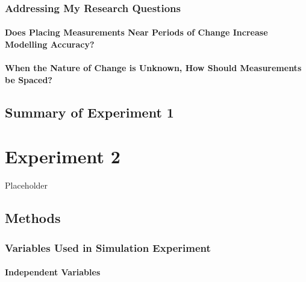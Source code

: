 \documentclass[
12pt, %
twoside,
english]{guelphthesis}
\begin{document}
\hypertarget{addressing-my-research-questions}{%
\subsection{Addressing My Research Questions}\label{addressing-my-research-questions}}

\hypertarget{does-placing-measurements-near-periods-of-change-increase-modelling-accuracy}{%
\subsubsection{Does Placing Measurements Near Periods of Change Increase Modelling Accuracy?}\label{does-placing-measurements-near-periods-of-change-increase-modelling-accuracy}}

\hypertarget{when-the-nature-of-change-is-unknown-how-should-measurements-be-spaced}{%
\subsubsection{When the Nature of Change is Unknown, How Should Measurements be Spaced?}\label{when-the-nature-of-change-is-unknown-how-should-measurements-be-spaced}}

\hypertarget{summary-of-experiment-1}{%
\section{Summary of Experiment 1}\label{summary-of-experiment-1}}

\hypertarget{experiment-2}{%
\chapter{Experiment 2}\label{experiment-2}}

Placeholder

\hypertarget{methods-1}{%
\section{Methods}\label{methods-1}}

\hypertarget{variables-used-in-simulation-experiment-1}{%
\subsection{Variables Used in Simulation Experiment}\label{variables-used-in-simulation-experiment-1}}

\hypertarget{independent-variables-1}{%
\subsubsection{Independent Variables}\label{independent-variables-1}}
\end{document}
